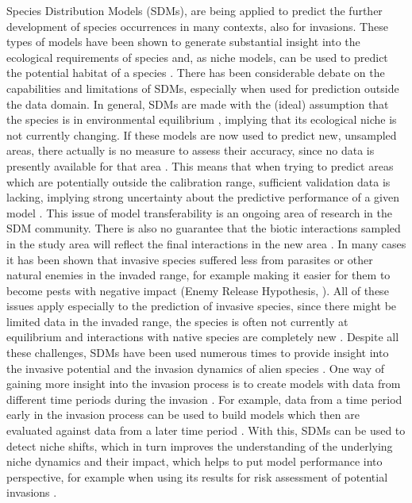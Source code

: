 \documentclass[12pt,a4paper]{article}
\begin{document}
Species Distribution Models (SDMs), are being applied to predict the further development of species occurrences in many contexts, also for invasions.
These types of models have been shown to generate substantial insight into the ecological requirements of species and, as niche models, can be used to predict the potential habitat of a species \autocite{araujo2006sdmchallenges}.
There has been considerable debate on the capabilities and limitations of SDMs, especially when used for prediction outside the data domain.
In general, SDMs are made with the (ideal) assumption that the species is in environmental equilibrium \autocite{elith2009sdmtheory}, implying that its ecological niche is not currently changing.
If these models are now used to predict new, unsampled areas, there actually is no measure to assess their accuracy, since no data is presently available for that area \autocite{araujo2006sdmchallenges}.
This means that when trying to predict areas which are potentially outside the calibration range, sufficient validation data is lacking, implying strong uncertainty about the predictive performance of a given model \autocite{araujo2006sdmchallenges}.
This issue of model transferability is an ongoing area of research in the SDM community.
There is also no guarantee that the biotic interactions sampled in the study area will reflect the final interactions in the new area \autocite{elith2009sdmtheory}.
In many cases it has been shown that invasive species suffered less from parasites or other natural enemies in the invaded range, for example making it easier for them to become pests with negative impact (Enemy Release Hypothesis, \autocite{williamson1996bioinvasions}).
All of these issues apply especially to the prediction of invasive species, since there might be limited data in the invaded range, the species is often not currently at equilibrium and interactions with native species are completely new \autocite{mainali2015sdmprojecting}.
Despite all these challenges, SDMs have been used numerous times to provide insight into the invasive potential and the invasion dynamics of alien species \autocite{zimmermann2010sdmtrends}.
One way of gaining more insight into the invasion process is to create models with data from different time periods during the invasion \autocite{briscoe2019palmerisdm}.
For example, data from a time period early in the invasion process can be used to build models which then are evaluated against data from a later time period \autocite{barbet2018nigrithoraxsdm}.
With this, SDMs can be used to detect niche shifts, which in turn improves the understanding of the underlying niche dynamics and their impact, which helps to put model performance into perspective, for example when using its results for risk assessment of potential invasions \autocite{pearman2008nicheSDM}.
\end{document}
